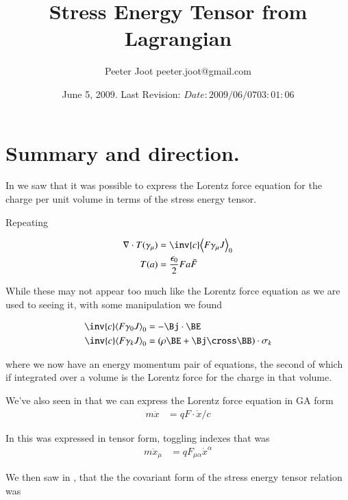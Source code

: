 \documentclass{article}
\title{Stress Energy Tensor from Lagrangian}\label{chap:stress_energy_noethers}
\author{Peeter Joot \quad peeter.joot@gmail.com }
\date{ June 5, 2009.  Last Revision: $Date: 2009/06/07 03:01:06 $ }
\begin{document}
\maketitle{}
\tableofcontents
\section{ Summary and direction. }

In 
\cite{PJstressEnergyLorentz} 
we saw that it was
possible to express the Lorentz force equation for the charge per unit
volume in terms of the stress energy tensor.

Repeating 

\begin{align}
\grad \cdot T(\gamma_\mu) &= \inv{c} \gpgradezero{ F \gamma_\mu J } \\
T(a) &= \frac{\epsilon_0}{2} F a \tilde{F}
\end{align}

While these
may not appear too much like the Lorentz force equation as we are used
to seeing it, with some manipulation we found 

\begin{align}
\inv{c} \gpgradezero{ F \gamma_0 J } &= -\Bj \cdot \BE \\
\inv{c} \gpgradezero{ F \gamma_k J } &= (\rho \BE + \Bj \cross \BB) \cdot \sigma_k
\end{align}

where we now have an energy momentum pair of equations, the second
of which if integrated over a volume is the Lorentz force for the charge
in that volume.

We've also seen in
that we can express the Lorentz force equation in GA form
\begin{align}
m \ddot{x} &= q F \cdot \dot{x}/c
\end{align}

In 
this was expressed in tensor form, toggling indexes that was
\begin{align}
m \ddot{x}_\mu &= {q} F_{\mu\alpha} \dot{x}^\alpha
\end{align}

We then saw in
\cite{PJenMtensor}
, that the
the covariant form of the stress energy tensor relation was
\end{document}
